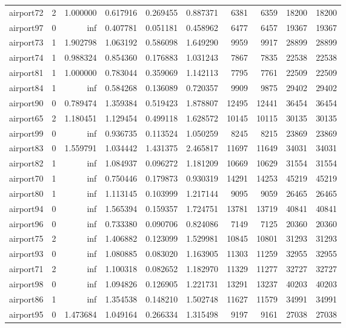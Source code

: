 \begin{longtable}{|l|r|r|r|r|r|r|r|r|r|}
airport72 & 2 & 1.000000 & 0.617916 & 0.269455 & 0.887371 & 6381 & 6359 & 18200 & 18200 \\
airport97 & 0 & inf & 0.407781 & 0.051181 & 0.458962 & 6477 & 6457 & 19367 & 19367 \\
airport73 & 1 & 1.902798 & 1.063192 & 0.586098 & 1.649290 & 9959 & 9917 & 28899 & 28899 \\
airport74 & 1 & 0.988324 & 0.854360 & 0.176883 & 1.031243 & 7867 & 7835 & 22538 & 22538 \\
airport81 & 1 & 1.000000 & 0.783044 & 0.359069 & 1.142113 & 7795 & 7761 & 22509 & 22509 \\
airport84 & 1 & inf & 0.584268 & 0.136089 & 0.720357 & 9909 & 9875 & 29402 & 29402 \\
airport90 & 0 & 0.789474 & 1.359384 & 0.519423 & 1.878807 & 12495 & 12441 & 36454 & 36454 \\
airport65 & 2 & 1.180451 & 1.129454 & 0.499118 & 1.628572 & 10145 & 10115 & 30135 & 30135 \\
airport99 & 0 & inf & 0.936735 & 0.113524 & 1.050259 & 8245 & 8215 & 23869 & 23869 \\
airport83 & 0 & 1.559791 & 1.034442 & 1.431375 & 2.465817 & 11697 & 11649 & 34031 & 34031 \\
airport82 & 1 & inf & 1.084937 & 0.096272 & 1.181209 & 10669 & 10629 & 31554 & 31554 \\
airport70 & 1 & inf & 0.750446 & 0.179873 & 0.930319 & 14291 & 14253 & 45219 & 45219 \\
airport80 & 1 & inf & 1.113145 & 0.103999 & 1.217144 & 9095 & 9059 & 26465 & 26465 \\
airport94 & 0 & inf & 1.565394 & 0.159357 & 1.724751 & 13781 & 13719 & 40841 & 40841 \\
airport96 & 0 & inf & 0.733380 & 0.090706 & 0.824086 & 7149 & 7125 & 20360 & 20360 \\
airport75 & 2 & inf & 1.406882 & 0.123099 & 1.529981 & 10845 & 10801 & 31293 & 31293 \\
airport93 & 0 & inf & 1.080885 & 0.083020 & 1.163905 & 11303 & 11259 & 32955 & 32955 \\
airport71 & 2 & inf & 1.100318 & 0.082652 & 1.182970 & 11329 & 11277 & 32727 & 32727 \\
airport98 & 0 & inf & 1.094826 & 0.126905 & 1.221731 & 13291 & 13237 & 40203 & 40203 \\
airport86 & 1 & inf & 1.354538 & 0.148210 & 1.502748 & 11627 & 11579 & 34991 & 34991 \\
airport95 & 0 & 1.473684 & 1.049164 & 0.266334 & 1.315498 & 9197 & 9161 & 27038 & 27038 \\

\end{longtable}
